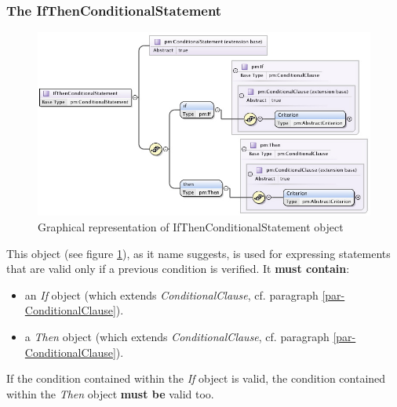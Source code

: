 \documentclass[a4paper,11pt] {ivoa}
\begin{document}
\subsubsection{The IfThenConditionalStatement}\label{par-IfThenConditionalStatement}
\begin{figure}[htbp]
\begin{center}
\includegraphics[width=1.0\textwidth]{pictures/IfThenStatement.jpg} 
\caption{Graphical representation of IfThenConditionalStatement object}
\label{Pic-IfThenConditionalStatement}
\end{center}
\end{figure}
This object (see figure \ref{Pic-IfThenConditionalStatement}), as it name suggests, is used for
expressing statements that are valid only if a previous condition is verified. It {\bf must
contain}:
\begin{itemize}
\item an  {\it If} object (which extends {\it ConditionalClause}, cf. paragraph
\ref{par-ConditionalClause}).
\item a {\it Then} object (which extends {\it ConditionalClause}, cf. paragraph
\ref{par-ConditionalClause}).
\end{itemize}
If the condition contained within the {\it If} object is valid, the condition contained within
the {\it Then} object {\bf must be} valid too.
\end{document}
